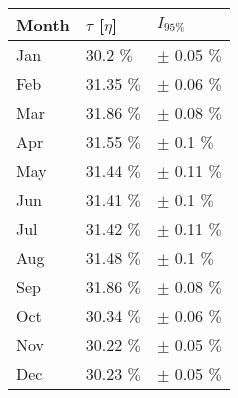 \begin{tabular}{lll}
\toprule
Month & $\tau$ [$\eta$] &       $I_{95\%}$ \\
\midrule
  Jan &       30.2 $\%$ &  $\pm$ 0.05 $\%$ \\
  Feb &      31.35 $\%$ &  $\pm$ 0.06 $\%$ \\
  Mar &      31.86 $\%$ &  $\pm$ 0.08 $\%$ \\
  Apr &      31.55 $\%$ &   $\pm$ 0.1 $\%$ \\
  May &      31.44 $\%$ &  $\pm$ 0.11 $\%$ \\
  Jun &      31.41 $\%$ &   $\pm$ 0.1 $\%$ \\
  Jul &      31.42 $\%$ &  $\pm$ 0.11 $\%$ \\
  Aug &      31.48 $\%$ &   $\pm$ 0.1 $\%$ \\
  Sep &      31.86 $\%$ &  $\pm$ 0.08 $\%$ \\
  Oct &      30.34 $\%$ &  $\pm$ 0.06 $\%$ \\
  Nov &      30.22 $\%$ &  $\pm$ 0.05 $\%$ \\
  Dec &      30.23 $\%$ &  $\pm$ 0.05 $\%$ \\
\bottomrule
\end{tabular}
